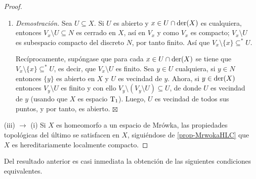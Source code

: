 \begin{proof}
\begin{enumerate}[\hspace{1.5 cm}, listparindent=1.5em]
  \item \textit{Demostración.} Sea $U \subseteq X$. Si $U$ es abierto y $x \in U \cap \operatorname{der}(X)$ es cualquiera, entonces $V_x \setminus U \subseteq N$ es cerrado en $X$, así en $V_x$ y como $V_x$ es compacto; $V_x \setminus U$ es subespacio compacto del discreto $N$, por tanto finito. Así que $V_x \setminus \{x\} \subseteq^* U$.
  
  Recíprocamente, supóngase que para cada $x \in U \cap \operatorname{der}(X)$ se tiene que $V_x \setminus \{x\} \subseteq^* U$, es decir, que $V_x \setminus U$ es finito. Sea $y \in U$ cualquiera, si $y \in N$ entonces $\{y\}$ es abierto en $X$ y $U$ es vecindad de $y$. Ahora, si $y \in \operatorname{der}(X)$ entonces $V_y \setminus U$ es finito y con ello $V_y \setminus (V_y \setminus U) \subseteq U$, de donde $U$ es vecindad de $y$ (usando que $X$ es espacio $\operatorname{T}_1$). Luego, $U$ es vecindad de todos sus puntos, y por tanto, es abierto. \hfill$\boxtimes$
 \end{enumerate}
 
 (iii) $\rightarrow$ (i) Si $X$ es homeomorfo a un espacio de Mrówka, las propiedades topológicas del último se satisfacen en $X$, siguiéndose de \ref{prop-MrwokaHLC} que $X$ es hereditariamente localmente compacto.
 \end{proof}
 
 Del resultado anterior es casi inmediata la obtención de las siguientes condiciones equivalentes.
 
